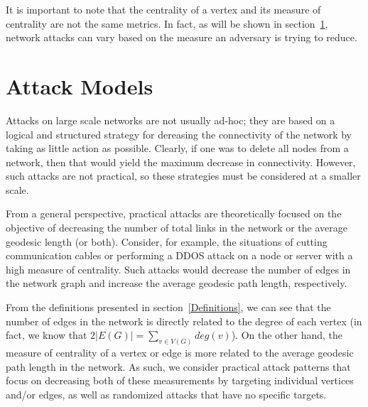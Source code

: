 \documentclass[11pt]{article}
\begin{document}
It is important to note that the centrality of a vertex and its measure of centrality are not the same metrics. In fact, as will be shown in section~\ref{AttackStrategies}, network attacks can vary based on the measure an adversary is trying to reduce. 




\section{Attack Models}
\label{AttackStrategies}
Attacks on large scale networks are not usually ad-hoc; they are based on a logical and structured strategy for dereasing the connectivity of the network by taking as little action as possible. Clearly, if one was to delete all nodes from a network, then that would yield the maximum decrease in connectivity. However, such attacks are not practical, so these strategies must be considered at a smaller scale. 

From a general perspective, practical attacks are theoretically focused on the objective of decreasing the number of total links in the network or the average geodesic length (or both). Consider, for example, the situations of cutting communication cables or performing a DDOS attack on a node or server with a high measure of centrality. Such attacks would decrease the number of edges in the network graph and increase the average geodesic path length, respectively. 

From the definitions presented in section~\ref{Definitions}, we can see that the number of edges in the network is directly related to the degree of each vertex (in fact, we know that $2|E(G)| =\sum_{v \in V(G)}deg(v)$). On the other hand, the measure of centrality of a vertex or edge is more related to the average geodesic path length in the network. As such, we consider practical attack patterns that focus on decreasing both of these measurements by targeting individual vertices and/or edges, as well as randomized attacks that have no specific targets. 
\end{document}
